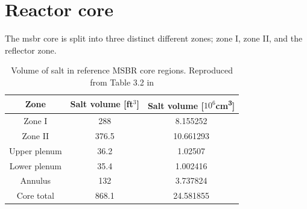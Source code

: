 \section{Reactor core}
\label{sec:msbr-core}
The \Gls{msbr} core is split into three distinct different zones; zone I, zone
II, and the reflector zone. 

\begin{table}[htpb]
    \centering
    \caption[Volume of salt in reference MSBR core regions]{Volume of salt in
reference MSBR core regions. Reproduced from Table 3.2 in
\cite{robertson_conceptual_1971}}
    \label{tab:salt-volumes}
    \begin{tabular}{|c|cc|}
        \hline
        Zone & Salt volume [ft$^3$] & Salt volume [$10^6$\unit{\centi\metre\cubed}] \\
        \hline
        Zone I & 288 & 8.155252 \\
        \hline
        Zone II & 376.5 & 10.661293 \\
        \hline
        Upper plenum & 36.2 & 1.02507 \\ 
        \hline
        Lower plenum & 35.4 & 1.002416 \\ 
        \hline
        Annulus & 132 & 3.737824\\
        \hline
        Core total & 868.1 & 24.581855 \\ 
        \hline
    \end{tabular}
\end{table}

